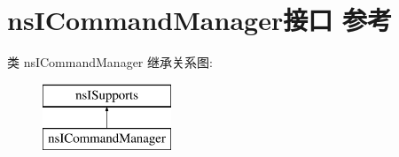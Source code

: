 \hypertarget{interfacens_i_command_manager}{}\section{ns\+I\+Command\+Manager接口 参考}
\label{interfacens_i_command_manager}
类 ns\+I\+Command\+Manager 继承关系图\+:\begin{figure}[H]
\begin{center}
\leavevmode
\includegraphics[height=2.000000cm]{interfacens_i_command_manager}
\end{center}
\end{figure}
